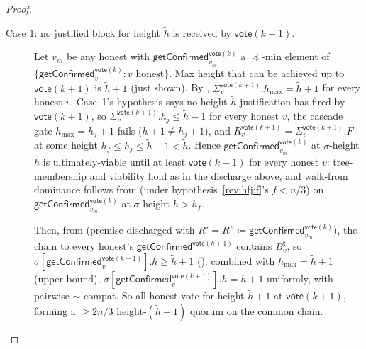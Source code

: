\ifx\litemode\undefined\documentclass{article}\fi
\newcommand{\hmax}{\ensuremath{h_{\max}}\xspace}
\newcommand{\uviable}{ultimately-viable\xspace}
\newcommand{\vote}{\ensuremath{\mathsf{vote}}}
\newcommand{\comm}[1]{\ensuremath{\widetilde{#1}}}
\newcommand{\getConfirmed}{\textsf{getConfirmed}\xspace}
\theoremstyle{plain}
\theoremstyle{definition}
\theoremstyle{remark}
\begin{document}
\begin{proof}
\begin{description}
  \item[Case 1: no justified block for height $\comm{h}$ is received by $\vote(k+1)$.]
  Let $v_m$ be any honest with $\getConfirmed_{v_m}^{\vote(k)}$ a $\preceq$-min element of $\{\getConfirmed_v^{\vote(k)} : v \text{ honest}\}$.
  Max height that can be achieved up to $\vote(k+1)$ is $\comm{h}+1$ (just shown).
  By , $\Sigma_v^{\vote(k+1)}.\hmax = \comm{h}+1$ for every honest $v$.
  Case~1's hypothesis says no height-$\comm{h}$ justification has fired by $\vote(k+1)$, so $\Sigma_v^{\vote(k+1)}.h_j \leq \comm{h}-1$ for every honest $v$, the cascade gate $\hmax = h_j+1$ fails ($\comm{h}+1 \neq h_j+1$), and $R_v^{\vote(k+1)} = \Sigma_v^{\vote(k+1)}.F$ at some height $h_f \leq h_j \leq \comm{h}-1 < \comm{h}$.
  Hence $\getConfirmed_{v_m}^{\vote(k)}$ at $\sigma$-height $\comm{h}$ is \uviable until at least $\vote(k+1)$ for every honest $v$:
  tree-membership and viability hold as in the discharge above, and walk-from dominance follows from  (under hypothesis~\ref{rev:hfj:f}'s $f<n/3$) on $\getConfirmed_{v_m}^{\vote(k)}$ at $\sigma$-height $\comm{h} > h_f$.

  Then, from  (premise discharged with $R' = R'' \coloneqq \getConfirmed_{v_m}^{\vote(k)}$), the chain to every honest's $\getConfirmed^{\vote(k+1)}$ contains $B^\sharp_v$, so $\sigma[\getConfirmed_v^{\vote(k+1)}].h \geq \comm{h}+1$ ();
  combined with $\hmax = \comm{h}+1$ (upper bound), $\sigma[\getConfirmed_v^{\vote(k+1)}].h = \comm{h}+1$ uniformly, with pairwise $\sim$-compat.
  So all honest vote for height $\comm{h}+1$ at $\vote(k+1)$, forming a $\geq 2n/3$ height-$(\comm{h}+1)$ quorum on the common chain.


\end{description}
\end{proof}
\end{document}
